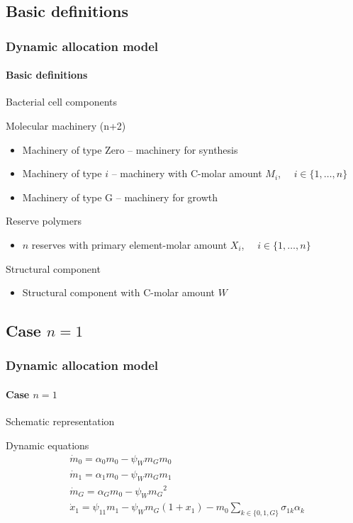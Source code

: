 \documentclass[handout]{beamer}
\begin{document}
\subsection{Basic definitions}
\begin{frame}
\frametitle{Dynamic allocation model}
\framesubtitle{Basic definitions}
\begin{block}{Bacterial cell components}
\begin{block}{Molecular machinery (n+2)}
\begin{itemize}
\item Machinery of type Zero -- machinery for synthesis\\
\item Machinery of type $i$ -- machinery with C-molar amount $M_{i}$, $\quad i\in\{1,\dots,n\}$\\
\item Machinery of type G -- machinery for growth
\end{itemize}
\end{block}

\begin{block}{Reserve polymers}
\begin{itemize}
\item $n$ reserves with primary element-molar amount $X_{i}$, $\quad i\in\{1,\dots,n\}$
\end{itemize}
\end{block}

\begin{block}{Structural component}
\begin{itemize}
\item Structural component with C-molar amount $W$
\end{itemize}
\end{block}

\end{block}
\end{frame}

\subsection{Case $n=1$}
\begin{frame}
\frametitle{Dynamic allocation model}
\framesubtitle{Case $n=1$}
\begin{block}{Schematic representation}
\begin{figure}[h]
	\label{ris:comp}
	\end{figure}
\end{block}

\begin{block}{Dynamic equations}
\begin{align*}
&\dot m_0 =\alpha_0 m_0-\psi_{W} m_G m_0\\
&\dot m_1 =\alpha_1 m_0-\psi_{W} m_G m_1\\
&\dot m_G =\alpha_G m_0-\psi_{W} {m_G}^2\\
&\dot x_1 =\psi_{11} m_1-\psi_{W} m_G\left(1+x_1\right) -m_0\sum_{k\in\{0,1,G\}}{\sigma_{1k}\alpha_k}\
\end{align*}
\end{block}

\end{frame}
\end{document}
